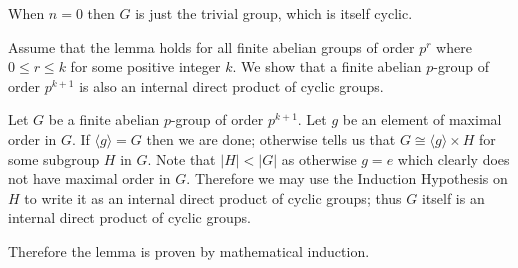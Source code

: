 \begin{questions}
    When $n = 0$ then $G$ is just the trivial group, which is itself cyclic.

    Assume that the lemma holds for all finite abelian groups of order $p^r$ where $0 \leq r \leq k$ for some positive integer $k$. We show that a finite abelian $p$-group of order $p^{k+1}$ is also an internal direct product of cyclic groups.

    Let $G$ be a finite abelian $p$-group of order $p^{k+1}$. Let $g$ be an element of maximal order in $G$. If $\langle g \rangle = G$ then we are done; otherwise  tells us that $G \cong \langle g \rangle \times H$ for some subgroup $H$ in $G$. Note that $|H| < |G|$ as otherwise $g = e$ which clearly does not have maximal order in $G$. Therefore we may use the Induction Hypothesis on $H$ to write it as an internal direct product of cyclic groups; thus $G$ itself is an internal direct product of cyclic groups.

    Therefore the lemma is proven by mathematical induction.
\end{questions}
